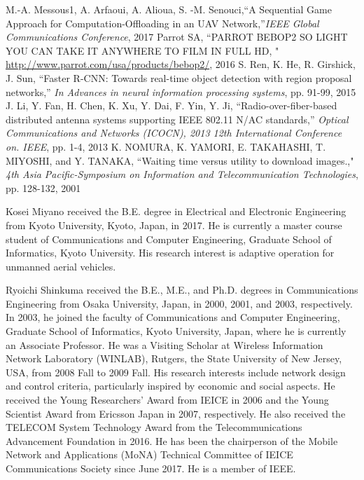\documentclass{ieeeaccess}
\begin{document}
\begin{thebibliography}{1}
%
 M.-A. Messous1, A. Arfaoui, A. Alioua, S. -M. Senouci,``A Sequential Game Approach for Computation-Offloading in an UAV Network,''\emph{IEEE Global Communications Conference}, 2017 
 Parrot SA, ``PARROT BEBOP2 SO LIGHT YOU CAN TAKE IT
ANYWHERE TO FILM IN FULL HD, "
\url{http://www.parrot.com/usa/products/bebop2/}, 2016
%
 S. Ren, K. He, R. Girshick, J. Sun, ``Faster R-CNN: Towards
real-time object detection with region proposal networks,'' \emph{In Advances in neural information processing systems}, pp. 91-99, 2015
 J. Li, Y. Fan, H. Chen, K. Xu, Y. Dai, F. Yin, Y. Ji,  ``Radio-over-fiber-based distributed antenna systems supporting IEEE 802.11 N/AC standards,'' \emph{Optical Communications and Networks (ICOCN), 2013 12th International Conference on. IEEE}, pp. 1-4, 2013
K. NOMURA, K. YAMORI, E. TAKAHASHI, T. MIYOSHI, and Y. TANAKA, ``Waiting time versus utility to download images.,"  \emph{4th Asia Pacific-Symposium on Information and Telecommunication Technologies}, pp. 128-132, 2001 

\end{thebibliography}



\begin{IEEEbiography}{Kosei Miyano} received the B.E. degree in Electrical
and Electronic Engineering from Kyoto University,
Kyoto, Japan, in 2017. He is currently a
master course student of Communications and
Computer Engineering, Graduate School of Informatics,
Kyoto University. His research interest
is adaptive operation for unmanned aerial vehicles.
\end{IEEEbiography}



\begin{IEEEbiography}{Ryoichi Shinkuma} received the B.E., M.E., and
Ph.D. degrees in Communications Engineering
from Osaka University, Japan, in 2000, 2001, and
2003, respectively. In 2003, he joined the faculty
of Communications and Computer Engineering,
Graduate School of Informatics, Kyoto University,
Japan, where he is currently an Associate Professor. He was a Visiting Scholar at Wireless Information Network Laboratory (WINLAB), Rutgers,
the State University of New Jersey, USA, from
2008 Fall to 2009 Fall. His research interests include network design and
control criteria, particularly inspired by economic and social aspects. He
received the Young Researchers' Award from IEICE in 2006 and the Young
Scientist Award from Ericsson Japan in 2007, respectively. He also received
the TELECOM System Technology Award from the Telecommunications
Advancement Foundation in 2016. He has been the chairperson of the
Mobile Network and Applications (MoNA) Technical Committee of IEICE
Communications Society since June 2017. He is a member of IEEE.
\end{IEEEbiography}
\end{document}
